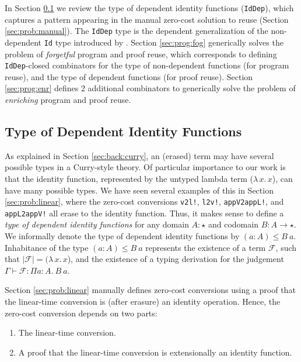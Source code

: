 \documentclass[acmsmall,screen]{acmart}
\newcommand{\refsec}[1]{Section \ref{sec:#1}}
\newcommand{\labsec}[1]{\label{sec:#1}}
\newcommand{\lam}[2]{\lambda\, #1.\, #2}
\begin{document}
In \refsec{prog:id} we review the type of dependent identity
functions (\verb;IdDep;), which captures a pattern appearing in the
manual zero-cost solution to reuse (\refsec{prob:manual}).
The \verb;IdDep; type is the dependent generalization of the
non-dependent \verb;Id; type introduced by \citet{firsov18b}.
\refsec{prog:fog} generically solves the
problem of \textit{forgetful} program and proof reuse, which corresponds to
defining \verb;IdDep;-closed combinators for
the type of non-dependent functions (for program reuse), and
the type of dependent functions (for proof reuse).
\refsec{prog:enr} defines 2 additional combinators to generically solve the
problem of \textit{enriching} program and proof reuse.

\subsection{Type of Dependent Identity Functions}
\labsec{prog:id}

As explained in \refsec{back:curry}, an (erased) term may have several
possible types in a Curry-style theory. Of particular importance to
our work is that the identity function, represented by the untyped
lambda term ($\lam{x}{x}$), can have many possible types. We have seen
several examples of this in \refsec{prob:linear}, where the zero-cost
conversions \verb;v2l!;, \verb;l2v!;, \verb;appV2appL!;, and
\verb;appL2appV!; all erase to the identity function. Thus, it makes
sense to define a \textit{type of dependent identity functions} for any domain
$A : \star$ and codomain $B : A \rightarrow \star$.
We informally denote the
type of dependent identity functions by $(a : A) \leq B~a$.
Inhabitance of the type $(a : A) \leq B~a$ represents
the existence of a term $\mathcal{F}$, such that
$|\mathcal{F}|=(\lam{x}{x}$), and the existence of a typing derivation
for the judgement $\Gamma\vdash \mathcal{F} : \Pi a : A.~B~a$.

\refsec{prob:linear} manually defines zero-cost conversions
using a proof that the linear-time conversion is (after erasure)
an identity operation. Hence, the zero-cost conversion depends on two parts:
\begin{enumerate}
\item The linear-time conversion.
\item A proof that the linear-time conversion is extensionally an
  identity function. 
\end{enumerate}
\end{document}
